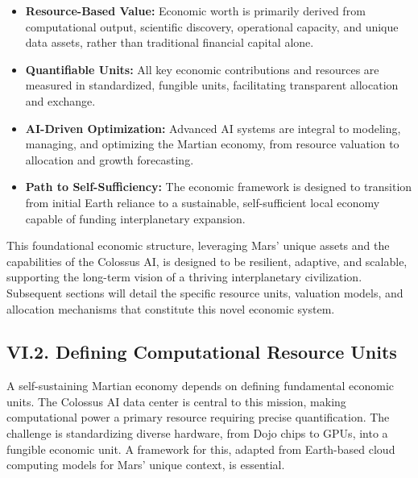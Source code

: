 \documentclass[fontsize=10pt, oneside, DIV=calc]{scrartcl}
\begin{document}
\begin{tcolorbox}[
  enhanced,
  breakable,
  colback=blue!5!white,
  colframe=blue!75!black,
  boxrule=0.6pt,
  arc=1mm,
  sharp corners,
  title=\textbf{Core Principles of the Martian Economy},
  fonttitle=\bfseries,
  before skip=6pt,
  after skip=6pt,
  left=3pt, right=3pt, top=3pt, bottom=3pt
]
\begin{itemize}
    \item \textbf{Resource-Based Value:} Economic worth is primarily derived from computational output, scientific discovery, operational capacity, and unique data assets, rather than traditional financial capital alone.
    \item \textbf{Quantifiable Units:} All key economic contributions and resources are measured in standardized, fungible units, facilitating transparent allocation and exchange.
    \item \textbf{AI-Driven Optimization:} Advanced AI systems are integral to modeling, managing, and optimizing the Martian economy, from resource valuation to allocation and growth forecasting.
    \item \textbf{Path to Self-Sufficiency:} The economic framework is designed to transition from initial Earth reliance to a sustainable, self-sufficient local economy capable of funding interplanetary expansion.
\end{itemize}
\end{tcolorbox}

\medskip

\noindent
This foundational economic structure, leveraging Mars' unique assets and the capabilities of the Colossus AI, is designed to be resilient, adaptive, and scalable, supporting the long-term vision of a thriving interplanetary civilization. Subsequent sections will detail the specific resource units, valuation models, and allocation mechanisms that constitute this novel economic system.



\subsection*{VI.2. Defining Computational Resource Units}



\medskip

\noindent
A self-sustaining Martian economy depends on defining fundamental economic units. The Colossus AI data center is central to this mission, making computational power a primary resource requiring precise quantification. The challenge is standardizing diverse hardware, from Dojo chips to GPUs, into a fungible economic unit. A framework for this, adapted from Earth-based cloud computing models for Mars' unique context, is essential.
\end{document}
